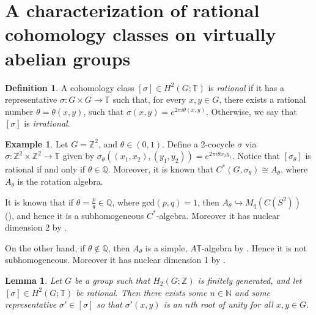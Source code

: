 \documentclass{amsart}
\newtheorem{lemma}[theorem]{Lemma}
\theoremstyle{definition}
\newtheorem{definition}[theorem]{Definition}
\newtheorem{example}[theorem]{Example}
\newcommand{\Z}{\mathbb{Z}}
\newcommand{\Q}{\mathbb{Q}}
\newcommand{\N}{\mathbb{N}}
\newcommand{\TT}{\mathbb{T}}
\begin{document}
\section{A characterization of rational cohomology classes on virtually abelian groups}
\begin{definition}\label{rational cocycle definition}
A cohomology class $[\sigma]\in H^2(G;\TT)$ is {\em rational} if it has a representative $\sigma \colon G\times G\to \TT$ such that, for every $x,y\in G$, there exists a rational number $\theta=\theta(x,y)$, such that $\sigma(x,y)=e^{2\pi i\theta(x,y)}$. Otherwise, we say that $[\sigma]$ is \emph{irrational}.
\end{definition}
\begin{example}\label{rotation algebras type of cocycle}
    Let $G=\Z^2$, and $\theta\in (0,1)$. Define a 2-cocycle $\sigma$ via $\sigma \colon \Z^2\times \Z^2\to \TT$ given by $\sigma_{\theta}((x_1,x_2),(y_1,y_2))=e^{2\pi i\theta x_2y_1}$. Notice that $[\sigma_{\theta}]$ is rational if and only if $\theta\in \Q$. Moreover, it is known that $C^*(G,\sigma_{\theta})\cong A_{\theta}$, where $A_{\theta}$ is the rotation algebra. \par
    It is known that if $\theta=\frac{p}{q}\in \Q$, where gcd$(p,q)=1$, then $A_{\theta}\hookrightarrow M_q(C(S^2))$ (\cite[Theorem 1.2]{rational_rotation_algebras_paper}), and hence it is a subhomogeneous $C^*$-algebra. Moreover it has nuclear dimension 2 by \cite[Example 6.1]{WZ10}. \par
    On the other hand, if $\theta\notin \Q$, then $A_{\theta}$ is a simple, $A\TT$-algebra by \cite[Theorem 4]{irrational_rotation_algebras_are_AT}. Hence it is not subhomogeneous. Moreover it has nuclear dimension 1 by \cite[Example 6.1]{WZ10}.
\end{example}

\begin{lemma}\label{rational implies n-th root}
Let $G$ be a group such that $H_2(G;\Z)$ is finitely generated, and let $[\sigma]\in H^2(G;\TT)$ be rational. Then there exists some $n\in\N$ and some representative $\sigma'\in[\sigma]$ so that $\sigma'(x,y)$ is an $n$th root of unity for all $x,y\in G$.
\end{lemma}
\end{document}
